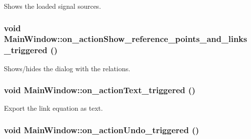 Shows the loaded signal sources. 

\hypertarget{class_main_window_0ba43a595333d050a6fd6cff8565ca47}{
\subsubsection[{on\_\-actionShow\_\-reference\_\-points\_\-and\_\-links\_\-triggered}]{\setlength{\rightskip}{0pt plus 5cm}void MainWindow::on\_\-actionShow\_\-reference\_\-points\_\-and\_\-links\_\-triggered ()}}
\label{class_main_window_0ba43a595333d050a6fd6cff8565ca47}


Shows/hides the dialog with the relations. 

\hypertarget{class_main_window_c2debfac33d16643a090b07af894d6db}{
\subsubsection[{on\_\-actionText\_\-triggered}]{\setlength{\rightskip}{0pt plus 5cm}void MainWindow::on\_\-actionText\_\-triggered ()}}
\label{class_main_window_c2debfac33d16643a090b07af894d6db}


Export the link equation as text. 

\hypertarget{class_main_window_bbab7cd8683132f28cf976d069c7c448}{
\subsubsection[{on\_\-actionUndo\_\-triggered}]{\setlength{\rightskip}{0pt plus 5cm}void MainWindow::on\_\-actionUndo\_\-triggered ()}}
\label{class_main_window_bbab7cd8683132f28cf976d069c7c448}


